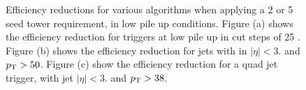 \begin{figure}[h!]
    \centering
     \newline
    \caption{Efficiency reductions for various \Lone algorithms when applying a 
    2 or 5 \GeV seed tower requirement, in low pile up 
    conditions. Figure (a) shows the efficiency reduction for \HT triggers at 
    low pile up in cut steps of 25 \GeV. Figure (b) 
    shows the efficiency reduction for jets with in $|\eta| <3.$ and $p_{\mathrm{T}} > 
    50$\GeV. Figure (c) show the efficiency reduction for a quad jet trigger, 
    with jet $|\eta| <3.$ and $p_{\mathrm{T}} > 38$\GeV.}
    
    \label{fig:lowpuratereduction}
\end{figure}



